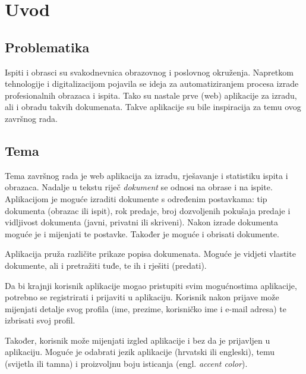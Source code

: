 






\tableofcontents

\newpage

\setcounter{page}{1}

\section{Uvod}

  \subsection{Problematika}

    Ispiti i obrasci su svakodnevnica obrazovnog i poslovnog okruženja.
    Napretkom tehnologije i digitalizacijom pojavila se ideja za
    automatiziranjem procesa izrade profesionalnih obrazaca i ispita. Tako su
    nastale prve (web) aplikacije za izradu, ali i obradu takvih dokumenata.
    Takve aplikacije su bile inspiracija za temu ovog završnog rada.

  \subsection{Tema}

    Tema završnog rada je web aplikacija za izradu, rješavanje i statistiku
    ispita i obrazaca. Nadalje u tekstu riječ \textit{dokument} se odnosi na
    obrase i na ispite. Aplikacijom je moguće izraditi dokumente s određenim
    postavkama: tip dokumenta (obrazac ili ispit), rok predaje, broj dozvoljenih
    pokušaja predaje i vidljivost dokumenta (javni, privatni ili skriveni).
    Nakon izrade dokumenta moguće je i mijenjati te postavke. Također je moguće
    i obrisati dokumente.

    Aplikacija pruža različite prikaze popisa dokumenata. Moguće je vidjeti
    vlastite dokumente, ali i pretražiti tuđe, te ih i rješiti (predati).

    Da bi krajnji korisnik aplikacije mogao pristupiti svim mogućnostima
    aplikacije, potrebno se registrirati i prijaviti u aplikaciju. Korisnik
    nakon prijave može mijenjati detalje svog profila (ime, prezime, korisničko
    ime i e-mail adresa) te izbrisati svoj profil.

    Također, korisnik može mijenjati izgled aplikacije i bez da je
    prijavljen u aplikaciju. Moguće je odabrati jezik aplikacije (hrvatski ili
    engleski), temu (svijetla ili tamna) i proizvoljnu boju isticanja (engl.
    \textit{accent color}).

